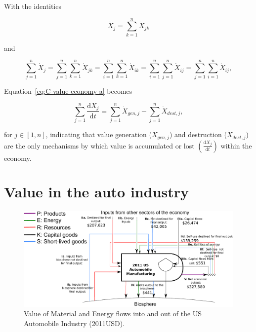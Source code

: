 \noindent{}With the identities

\begin{equation} \label{eq:X_identity_1}
	\dot{X}_{j}  
	= \sum\limits_{k=1}^n \dot{X}_{jk}
\end{equation}

\noindent{}and

\begin{equation} \label{eq:X_identity_2}
	\sum\limits_{j=1}^n\dot{X}_{j}  
	= \sum\limits_{j=1}^n \sum\limits_{k=1}^n \dot{X}_{jk}
	= \sum\limits_{i=1}^n \sum\limits_{k=1}^n \dot{X}_{ik}
	= \sum\limits_{i=1}^n \sum\limits_{j=1}^n \dot{X}_{ij}
	= \sum\limits_{j=1}^n \sum\limits_{i=1}^n \dot{X}_{ij},
\end{equation}

\noindent{}Equation~\ref{eq:C-value-economy-a} becomes

\begin{equation}\label{eq:C-value-economy-b}
	\sum\limits_{j=1}^{n} \frac{\mathrm{d}X_{j}}{\mathrm{d}t}
	= \sum\limits_{j=1}^{n} \dot{X}_{gen,j}
	- \sum\limits_{j=1}^{n} \dot{X}_{dest,j},
\end{equation}

\noindent{}for $j \in [1, n]$, indicating that 
value generation ($\dot{X}_{gen,j}$) 
and destruction ($\dot{X}_{dest,j}$)
are the only mechanisms by which value is accumulated or lost
$\left( \frac{\mathrm{d}X_{j}}{\mathrm{d}t} \right)$
within the economy.


\section{Value in the auto industry}
\label{sec:value_auto}

\begin{figure}[!ht]
\centering
\includegraphics[width=1.0\linewidth]{Part_2/Chapter_Values/images/PERKS_basic_unit_value_auto_ind.pdf}
\caption[Value of Material and Energy flows into and out of the US Automobile Industry]{Value of Material and Energy flows into and out of the US Automobile Industry (2011USD).}
\label{fig:PERKS_value_auto_ind}
\end{figure}


